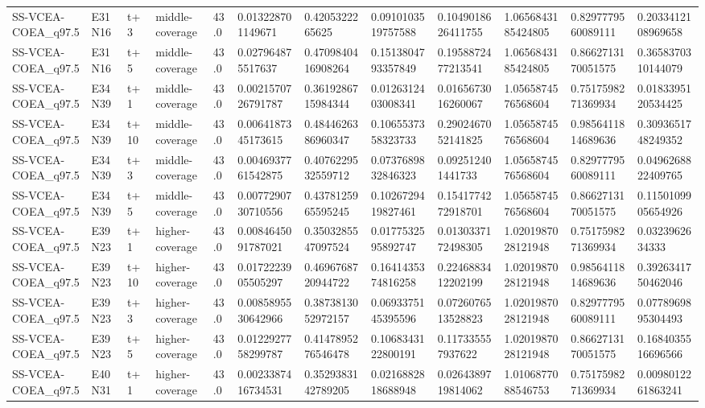 \begin{landscape}
\begin{longtable}{llllllllllll}
SS-VCEA-COEA\_q97.5 & E31N16 & t+3 & middle-coverage & 43.0 & 0.013228701149671 & 0.4205322265625 & 0.0910103519757588 & 0.1049018626411755 & 1.0656843185424805 & 0.8297779560089111 & 0.2033412108969658 \\
SS-VCEA-COEA\_q97.5 & E31N16 & t+5 & middle-coverage & 43.0 & 0.027964875517637 & 0.4709840416908264 & 0.1513804793357849 & 0.1958872477213541 & 1.0656843185424805 & 0.8662713170051575 & 0.3658370310144079 \\
SS-VCEA-COEA\_q97.5 & E34N39 & t+1 & middle-coverage & 43.0 & 0.0021570726791787 & 0.3619286715984344 & 0.0126312403008341 & 0.0165673016260067 & 1.0565874576568604 & 0.7517598271369934 & 0.0183395120534425 \\
SS-VCEA-COEA\_q97.5 & E34N39 & t+10 & middle-coverage & 43.0 & 0.0064187345173615 & 0.4844626386960347 & 0.1065537358323733 & 0.2902467052141825 & 1.0565874576568604 & 0.9856411814689636 & 0.3093651748249352 \\
SS-VCEA-COEA\_q97.5 & E34N39 & t+3 & middle-coverage & 43.0 & 0.0046937761542875 & 0.4076229532559712 & 0.0737689832846323 & 0.092512401441733 & 1.0565874576568604 & 0.8297779560089111 & 0.0496268822409765 \\
SS-VCEA-COEA\_q97.5 & E34N39 & t+5 & middle-coverage & 43.0 & 0.0077290730710556 & 0.4378125965595245 & 0.1026729419827461 & 0.1541774272918701 & 1.0565874576568604 & 0.8662713170051575 & 0.1150109905654926 \\
SS-VCEA-COEA\_q97.5 & E39N23 & t+1 & higher-coverage & 43.0 & 0.0084645091787021 & 0.3503285547097524 & 0.0177532595892747 & 0.0130337172498305 & 1.0201987028121948 & 0.7517598271369934 & 0.0323962634333 \\
SS-VCEA-COEA\_q97.5 & E39N23 & t+10 & higher-coverage & 43.0 & 0.0172223905505297 & 0.4696768720944722 & 0.1641435374816258 & 0.2246883412202199 & 1.0201987028121948 & 0.9856411814689636 & 0.3926341750462046 \\
SS-VCEA-COEA\_q97.5 & E39N23 & t+3 & higher-coverage & 43.0 & 0.0085895530642966 & 0.3873813052972157 & 0.0693375145395596 & 0.0726076513528823 & 1.0201987028121948 & 0.8297779560089111 & 0.0778969895304493 \\
SS-VCEA-COEA\_q97.5 & E39N23 & t+5 & higher-coverage & 43.0 & 0.0122927758299787 & 0.4147895276546478 & 0.1068343122800191 & 0.117335557937622 & 1.0201987028121948 & 0.8662713170051575 & 0.1684035516696566 \\
SS-VCEA-COEA\_q97.5 & E40N31 & t+1 & higher-coverage & 43.0 & 0.0023387416734531 & 0.3529383142789205 & 0.0216882818688948 & 0.0264389719814062 & 1.0106877088546753 & 0.7517598271369934 & 0.0098012261863241 \\

\end{longtable}
\end{landscape}
